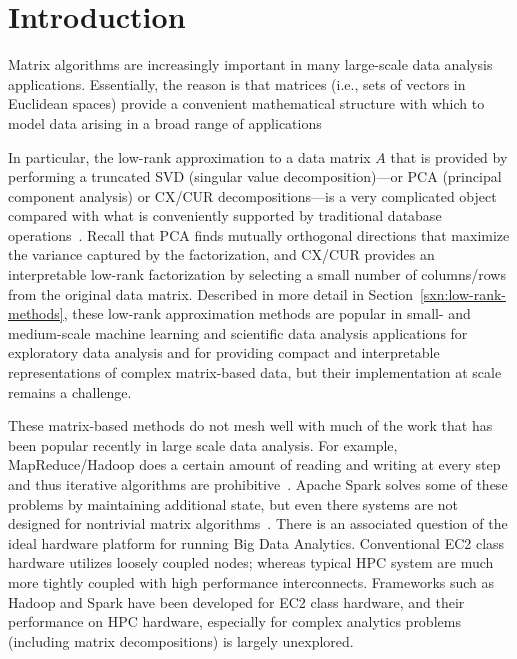 \section{Introduction}
\label{sec:intro}

Matrix algorithms are increasingly important in many large-scale data analysis applications.
Essentially, the reason is that matrices (i.e., sets of vectors in Euclidean
spaces) provide a convenient mathematical structure with which to model data
arising in a broad range of applications

In particular, the low-rank approximation to a data matrix $A$ that is provided
by performing a truncated SVD (singular value decomposition)---or PCA
(principal component analysis) or CX/CUR decompositions---is a very complicated
object compared with what is conveniently supported by traditional database
operations~\cite{Skillicorn07}. Recall that PCA finds mutually orthogonal
directions that maximize the variance captured by the factorization, and CX/CUR
provides an interpretable low-rank factorization by selecting a small number of
columns/rows from the original data matrix.  Described in more detail in
Section~\ref{sxn:low-rank-methods}, these low-rank approximation methods are
popular in small- and medium-scale machine learning and scientific data
analysis applications for exploratory data analysis and for
providing compact and interpretable representations of complex matrix-based
data, but their implementation at scale remains a challenge.

These matrix-based methods do not mesh well with much of the work that has been popular recently in large scale data analysis.
For example, MapReduce/Hadoop does a certain amount of reading and writing at every step and thus iterative algorithms are prohibitive~\cite{DG08_CACM}.
Apache Spark solves some of these problems by maintaining additional state, but even there systems are not designed for nontrivial matrix algorithms~\cite{SPARK_NSDI_12}. There is an associated question of the ideal hardware platform for running Big Data Analytics. Conventional EC2 class hardware utilizes loosely coupled nodes; whereas typical HPC system are much more tightly coupled with high performance interconnects. Frameworks such as Hadoop and Spark have been developed for EC2 class hardware, and their performance on HPC hardware, especially for complex analytics problems (including matrix decompositions) is largely unexplored. 

